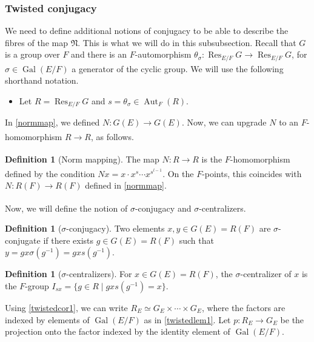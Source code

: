 \documentclass[11pt,a4paper]{article}
\theoremstyle{definition}
\newtheorem{D}[shared]{Definition}
\theoremstyle{plain}
\theoremstyle{remark}
\theoremstyle{plain}
\DeclareMathOperator{\Aut}{Aut}
\DeclareMathOperator{\Gal}{Gal}
\DeclareMathOperator{\Res}{Res}
\begin{document}
\subsubsection{Twisted conjugacy}\label{twistedconjsection}

We need to define additional notions of conjugacy to be able to describe the fibres of the map $\mathfrak{N}$. This is what we will do in this subsubsection. Recall that $G$ is a group over $F$ and there is an $F$-automorphism $\theta_{\sigma}:\Res_{E/F}G \xrightarrow[]{} \Res_{E/F}G$, for $\sigma \in \Gal(E/F)$ a generator of the cyclic group. We will use the following shorthand notation.

\begin{itemize}
    \item Let $R = \Res_{E/F}G$ and $s = \theta_{\sigma} \in \Aut_F(R)$.
\end{itemize}

In \ref{normmap}, we defined $N: G(E) \xrightarrow[]{} G(E)$. Now, we can upgrade $N$ to an $F$-homomorphism $R \xrightarrow[]{} R$, as follows.

\begin{D}[Norm mapping]
    The map $N: R \xrightarrow[]{} R$ is the $F$-homomorphism defined by the condition $Nx = x \cdot x^s \cdots x^{s^{l-1}}$. On the $F$-points, this coincides with $N: R(F) \xrightarrow[]{} R(F)$ defined in \ref{normmap}.
\end{D}

Now, we will define the notion of $\sigma$-conjugacy and $\sigma$-centralizers.

\begin{D}[$\sigma$-conjugacy]\label{sigmaconjdef}
    Two elements $x , y \in G(E) = R(F)$ are $\sigma$-conjugate if there exists $g \in G(E) = R(F)$ such that $y = gx\sigma(g^{-1}) = gxs(g^{-1})$.
\end{D}

\begin{D}[$\sigma$-centralizers]\label{sigmacentralizerdef}
    For $x \in G(E) = R(F)$, the $\sigma$-centralizer of $x$ is the $F$-group $I_{sx} = \{ g \in R \mid gxs(g^{-1}) = x \}$.
\end{D}

Using \ref{twistedcor1}, we can write $R_E \simeq G_E \times \cdots \times G_E$, where the factors are indexed by elements of $\Gal(E/F)$ as in \ref{twistedlem1}. Let $p: R_E \xrightarrow{} G_E$ be the projection onto the factor indexed by the identity element of $\Gal(E/F)$.
\end{document}
